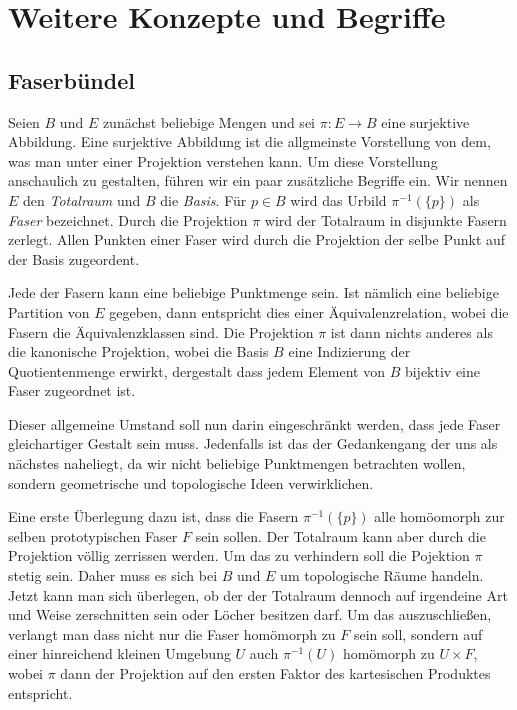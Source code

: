 

\chapter{Weitere Konzepte und Begriffe}

\section{Faserbündel}

Seien $B$ und $E$ zunächst beliebige Mengen und sei $\pi\colon E\to B$
eine surjektive Abbildung. Eine surjektive Abbildung ist die allgmeinste
Vorstellung von dem, was man unter einer Projektion verstehen kann.
Um diese Vorstellung anschaulich zu gestalten, führen wir ein paar
zusätzliche Begriffe ein. Wir nennen $E$ den \emph{Totalraum} und $B$
die \emph{Basis}. Für $p\in B$ wird das Urbild $\pi^{-1}(\{p\})$ als
\emph{Faser} bezeichnet. Durch die Projektion $\pi$ wird der Totalraum
in disjunkte Fasern zerlegt. Allen Punkten einer Faser wird durch
die Projektion der selbe Punkt auf der Basis zugeordent.

Jede der Fasern kann eine beliebige Punktmenge sein. Ist nämlich eine
beliebige Partition von $E$ gegeben, dann entspricht dies einer
Äquivalenzrelation, wobei die Fasern die Äquivalenzklassen sind.
Die Projektion $\pi$ ist dann nichts anderes als die kanonische
Projektion, wobei die Basis $B$ eine Indizierung der Quotientenmenge
erwirkt, dergestalt dass jedem Element von $B$ bijektiv eine Faser
zugeordnet ist.

Dieser allgemeine Umstand soll nun darin eingeschränkt werden, dass
jede Faser gleichartiger Gestalt sein muss. Jedenfalls ist das der
Gedankengang der uns als nächstes naheliegt, da wir nicht beliebige
Punktmengen betrachten wollen, sondern geometrische und topologische
Ideen verwirklichen.

Eine erste Überlegung dazu ist, dass die Fasern $\pi^{-1}(\{p\})$ alle
homöomorph zur selben prototypischen Faser $F$ sein sollen. Der
Totalraum kann aber durch die Projektion völlig zerrissen werden.
Um das zu verhindern soll die Pojektion $\pi$ stetig sein. Daher muss
es sich bei $B$ und $E$ um topologische Räume handeln. Jetzt kann man
sich überlegen, ob der der Totalraum dennoch auf irgendeine Art und
Weise zerschnitten sein oder Löcher besitzen darf. Um das auszuschließen,
verlangt man dass nicht nur die Faser homömorph zu $F$ sein soll,
sondern auf einer hinreichend kleinen Umgebung $U$ auch
$\pi^{-1}(U)$ homömorph zu $U\times F$, wobei $\pi$ dann der
Projektion auf den ersten Faktor des kartesischen Produktes
entspricht.

